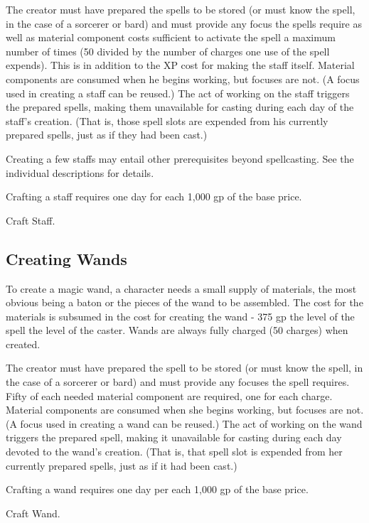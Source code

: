 The creator must have prepared the spells to be stored (or must know the spell, in the case of a sorcerer or bard) and must provide any focus the spells require as well as material component costs sufficient to activate the spell a maximum number of times (50 divided by the number of charges one use of the spell expends). This is in addition to the XP cost for making the staff itself. Material components are consumed when he begins working, but focuses are not. (A focus used in creating a staff can be reused.) The act of working on the staff triggers the prepared spells, making them unavailable for casting during each day of the staff's creation. (That is, those spell slots are expended from his currently prepared spells, just as if they had been cast.)

Creating a few staffs may entail other prerequisites beyond spellcasting. See the individual descriptions for details.

Crafting a staff requires one day for each 1,000 gp of the base price.

 Craft Staff.

\subsection{Creating Wands}

To create a magic wand, a character needs a small supply of materials, the most obvious being a baton or the pieces of the wand to be assembled. The cost for the materials is subsumed in the cost for creating the wand - 375 gp \mtimes the level of the spell \mtimes the level of the caster. Wands are always fully charged (50 charges) when created.

The creator must have prepared the spell to be stored (or must know the spell, in the case of a sorcerer or bard) and must provide any focuses the spell requires. Fifty of each needed material component are required, one for each charge. Material components are consumed when she begins working, but focuses are not. (A focus used in creating a wand can be reused.) The act of working on the wand triggers the prepared spell, making it unavailable for casting during each day devoted to the wand's creation. (That is, that spell slot is expended from her currently prepared spells, just as if it had been cast.)

Crafting a wand requires one day per each 1,000 gp of the base price.

 Craft Wand.

